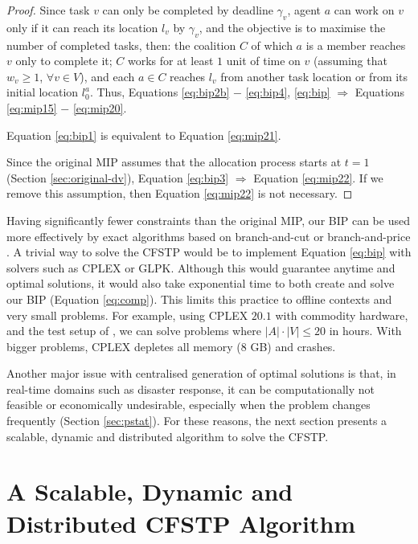 \begin{proof}
    Since task $v$ can only be completed by deadline $\gamma_v$, agent $a$ can work on $v$
    only if it can reach its location $l_v$ by $\gamma_v$, and the objective is to
    maximise the number of completed tasks, then: the coalition $C$ of which $a$ is a
    member reaches $v$ only to complete it; $C$ works for at least $1$ unit of time on $v$
    (assuming that $w_v \geq 1$, $\forall v \in V$), and each $a \in C$ reaches $l_v$ from
    another task location or from its initial location $l_0^a$. Thus, Equations
    \ref{eq:bip2b} $-$ \ref{eq:bip4}, \ref{eq:bip} $\Rightarrow$ Equations \ref{eq:mip15} $-$
    \ref{eq:mip20}.

    Equation \ref{eq:bip1} is equivalent to Equation \ref{eq:mip21}.

    Since the original MIP assumes that the allocation process starts at $t = 1$ (Section
    \ref{sec:original-dv}), Equation \ref{eq:bip3} $\Rightarrow$ Equation \ref{eq:mip22}. If
    we remove this assumption, then Equation \ref{eq:mip22} is not necessary.
\end{proof}
Having significantly fewer constraints than the original MIP, our BIP can be used more
effectively by exact algorithms based on branch-and-cut or branch-and-price \cite[Section
$3.1.1$]{top2019}. A trivial way to solve the CFSTP would be to implement Equation
\ref{eq:bip} with solvers such as CPLEX or GLPK. Although this would guarantee anytime and
optimal solutions, it would also take exponential time to both create and solve our BIP
(Equation \ref{eq:comp}). This limits this practice to offline contexts and very small
problems. For example, using CPLEX $20.1$ with commodity hardware, and the test setup of
\cite{ramchurn2010cfstp}, we can solve problems where $|A| \cdot |V| \leq 20$ in hours.
With bigger problems, CPLEX depletes all memory ($8$ GB) and crashes.

Another major issue with centralised generation of optimal solutions is that, in real-time
domains such as disaster response, it can be computationally not feasible or economically
undesirable, especially when the problem changes frequently (Section \ref{sec:pstat}). For
these reasons, the next section presents a scalable, dynamic and distributed algorithm to
solve the CFSTP.

\section{A Scalable, Dynamic and Distributed CFSTP Algorithm}\label{sec:dcts}

